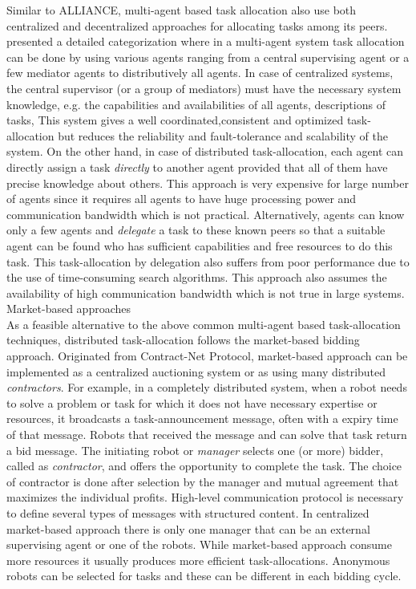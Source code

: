 Similar to  ALLIANCE, multi-agent based task allocation also  use both centralized and decentralized approaches for allocating tasks among  its  peers.  presented a detailed categorization where in a multi-agent system task allocation can be done by using various agents ranging from a central supervising agent or a few mediator agents to distributively all agents. In case of centralized systems, the central supervisor (or a group of mediators)  must have the necessary system knowledge, e.g. the capabilities and availabilities of all agents, descriptions of tasks, This system gives a well coordinated,consistent and optimized task-allocation but reduces  the reliability and fault-tolerance and scalability of the system. On the other hand, in case of distributed task-allocation, each agent can directly assign a task {\em directly} to another agent provided that all of them have precise knowledge about others. This approach is very expensive for large number of agents since it requires all agents to have huge processing power and communication bandwidth which is not practical. Alternatively, agents can know only a few agents and {\em delegate} a task to these known peers so that a suitable agent can be found who has sufficient capabilities and free resources to do this task. This task-allocation by delegation also suffers from poor performance  due to the use of time-consuming search algorithms. This approach also assumes the availability of high communication bandwidth which is not true in large systems. \\

Market-based approaches\\
As a feasible alternative to the above common multi-agent based task-allocation techniques, distributed  task-allocation follows the market-based bidding approach. Originated from Contract-Net Protocol, market-based approach can be implemented as a centralized auctioning system or as using many distributed {\em contractors}. For example, in a completely distributed system, when a robot needs to solve a problem or task for which it does not have necessary expertise or resources, it broadcasts a task-announcement message, often with  a expiry time of that message. Robots that received the message and can solve that task return a bid message. The initiating robot or {\em  manager} selects one (or more) bidder, called as {\em contractor}, and offers the opportunity to complete the task. The choice of contractor is done after selection by the manager and mutual agreement that maximizes the individual profits. High-level communication protocol is necessary to define several types of messages with structured content. In centralized market-based approach there is only one manager that can be an external supervising agent or  one of the robots. While market-based approach consume more resources it usually produces more efficient task-allocations. Anonymous robots can be selected for tasks and these can be different in each bidding cycle.\\

